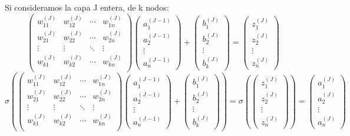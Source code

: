 \documentclass{article}
\begin{document}
Si consideramos la capa J entera, de k nodos:
$$
\left( \begin{matrix}
w_{11}^{(J)} & w_{12}^{(J)} & \cdots & w_{1n}^{(J)} \\
w_{21}^{(J)} & w_{22}^{(J)} & \cdots & w_{2n}^{(J)} \\
\vdots & \vdots & \ddots & \vdots\\
w_{k1}^{(J)} & w_{k2}^{(J)} & \cdots & w_{kn}^{(J)} \\
\end{matrix} \right)
\left( \begin{matrix}
a_{1}^{(J-1)} \\
a_{2}^{(J-1)} \\
\vdots \\
a_{n}^{(J-1)}
\end{matrix} \right)
+
\left( \begin{matrix}
b_{1}^{(J)} \\
b_{2}^{(J)} \\
\vdots \\
b_{k}^{(J)}
\end{matrix} \right)
=
\left( \begin{matrix}
z_{1}^{(J)} \\
z_{2}^{(J)} \\
\vdots \\
z_{n}^{(J)}
\end{matrix} \right)
$$
$$
\sigma
(
\left( \begin{matrix}
w_{11}^{(J)} & w_{12}^{(J)} & \cdots & w_{1n}^{(J)} \\
w_{21}^{(J)} & w_{22}^{(J)} & \cdots & w_{2n}^{(J)} \\
\vdots & \vdots & \ddots & \vdots\\
w_{k1}^{(J)} & w_{k2}^{(J)} & \cdots & w_{kn}^{(J)} \\
\end{matrix} \right)
\left( \begin{matrix}
a_{1}^{(J-1)} \\
a_{2}^{(J-1)} \\
\vdots \\
a_{n}^{(J-1)}
\end{matrix} \right)
+
\left( \begin{matrix}
b_{1}^{(J)} \\
b_{2}^{(J)} \\
\vdots \\
b_{k}^{(J)}
\end{matrix} \right)
)
=
\sigma
(
\left( \begin{matrix}
z_{1}^{(J)} \\
z_{2}^{(J)} \\
\vdots \\
z_{n}^{(J)}
\end{matrix} \right)
)
=
\left( \begin{matrix}
a_{1}^{(J)} \\
a_{2}^{(J)} \\
\vdots \\
a_{n}^{(J)}
\end{matrix} \right)
$$
\end{document}
